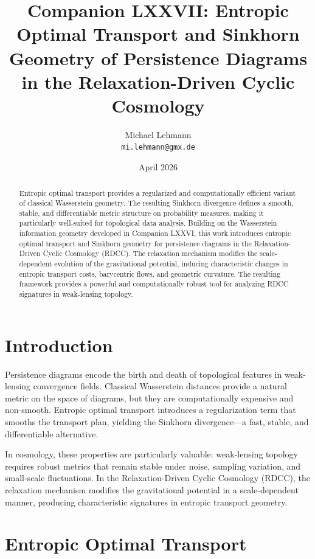 \documentclass[11pt,a4paper]{article}
\title{\textbf{Companion LXXVII: Entropic Optimal Transport and Sinkhorn Geometry of Persistence Diagrams in the Relaxation-Driven Cyclic Cosmology}}
\author{Michael Lehmann \\ \texttt{mi.lehmann@gmx.de}}
\date{April 2026}
\begin{document}
\maketitle

\begin{abstract}
Entropic optimal transport provides a regularized and computationally efficient 
variant of classical Wasserstein geometry. The resulting Sinkhorn divergence 
defines a smooth, stable, and differentiable metric structure on probability 
measures, making it particularly well-suited for topological data analysis. 
Building on the Wasserstein information geometry developed in Companion LXXVI, 
this work introduces entropic optimal transport and Sinkhorn geometry for 
persistence diagrams in the Relaxation-Driven Cyclic Cosmology (RDCC). The 
relaxation mechanism modifies the scale-dependent evolution of the gravitational 
potential, inducing characteristic changes in entropic transport costs, barycentric 
flows, and geometric curvature. The resulting framework provides a powerful and 
computationally robust tool for analyzing RDCC signatures in weak-lensing topology.
\end{abstract}
\section{Introduction}

Persistence diagrams encode the birth and death of topological features in weak-
lensing convergence fields. Classical Wasserstein distances provide a natural 
metric on the space of diagrams, but they are computationally expensive and 
non-smooth. Entropic optimal transport introduces a regularization term that 
smooths the transport plan, yielding the Sinkhorn divergence—a fast, stable, and 
differentiable alternative.

In cosmology, these properties are particularly valuable: weak-lensing topology 
requires robust metrics that remain stable under noise, sampling variation, and 
small-scale fluctuations. In the Relaxation-Driven Cyclic Cosmology (RDCC), the 
relaxation mechanism modifies the gravitational potential in a scale-dependent 
manner, producing characteristic signatures in entropic transport geometry.
\section{Entropic Optimal Transport}
\end{document}
